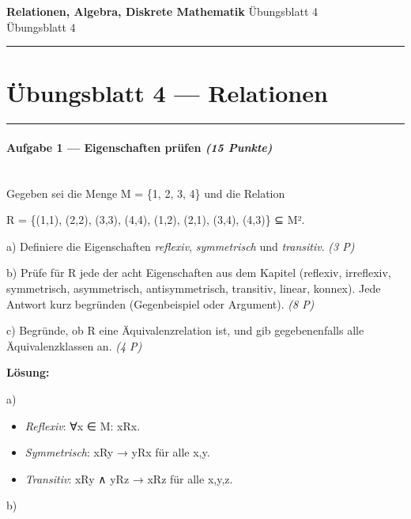 \documentclass[11pt, a4paper]{article}
\providecommand{\nichttitle}{Übungsblatt}
\providecommand{\nichtsubtitle}{}
\renewcommand{\nichttitle}{Relationen, Algebra, Diskrete Mathematik}
\renewcommand{\nichtsubtitle}{Übungsblatt 4}
\begin{document}
\begin{center}
{\Large\bfseries\color{accent}\nichttitle}
\ifx\nichtsubtitle\empty\else
  \\[2pt]{\normalsize\color{accent!80!black}\nichtsubtitle}
\fi
\\[2pt]
\color{accent}\rule{0.4\linewidth}{0.8pt}\color{black}
\end{center}
\vspace{4pt}


\section{Übungsblatt 4 — Relationen}


\noindent\textcolor{rulegray}{\rule{\linewidth}{0.4pt}}


\paragraph{Aufgabe 1 — Eigenschaften prüfen \textit{(15 Punkte)}}\mbox{}\\[2pt]

Gegeben sei die Menge M = \{1, 2, 3, 4\} und die Relation

R = \{(1,1), (2,2), (3,3), (4,4), (1,2), (2,1), (3,4), (4,3)\} ⊆ M².


a) Definiere die Eigenschaften \textit{reflexiv}, \textit{symmetrisch} und \textit{transitiv}. \textit{(3 P)}

b) Prüfe für R jede der acht Eigenschaften aus dem Kapitel (reflexiv, irreflexiv, symmetrisch, asymmetrisch, antisymmetrisch, transitiv, linear, konnex). Jede Antwort kurz begründen (Gegenbeispiel oder Argument). \textit{(8 P)}

c) Begründe, ob R eine Äquivalenzrelation ist, und gib gegebenenfalls alle Äquivalenzklassen an. \textit{(4 P)}


\textbf{Lösung:}


a)

\begin{itemize}
  \item \textit{Reflexiv}: ∀x ∈ M: xRx.
  \item \textit{Symmetrisch}: xRy → yRx für alle x,y.
  \item \textit{Transitiv}: xRy ∧ yRz → xRz für alle x,y,z.
\end{itemize}

b)
\end{document}

